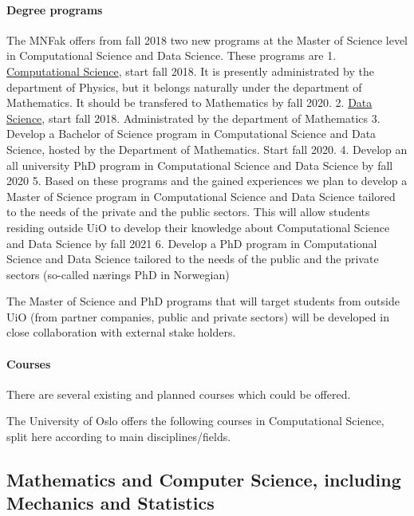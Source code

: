 \documentclass[]{article}
\let\oldparagraph\paragraph
\renewcommand{\paragraph}[1]{\oldparagraph{#1}\mbox{}}
\begin{document}
\hypertarget{degree-programs}{%
\paragraph{Degree programs}\label{degree-programs}}

The MNFak offers from fall 2018 two new programs at the Master of
Science level in Computational Science and Data Science. These programs
are 1.
\href{http://www.uio.no/english/studies/programmes/computational-science-master/index.html}{Computational
Science}, start fall 2018. It is presently administrated by the
department of Physics, but it belongs naturally under the department of
Mathematics. It should be transfered to Mathematics by fall 2020. 2.
\href{http://www.uio.no/english/studies/programmes/datascience-master/index.html}{Data
Science}, start fall 2018. Administrated by the department of
Mathematics 3. Develop a Bachelor of Science program in Computational
Science and Data Science, hosted by the Department of Mathematics. Start
fall 2020. 4. Develop an all university PhD program in Computational
Science and Data Science by fall 2020 5. Based on these programs and the
gained experiences we plan to develop a Master of Science program in
Computational Science and Data Science tailored to the needs of the
private and the public sectors. This will allow students residing
outside UiO to develop their knowledge about Computational Science and
Data Science by fall 2021 6. Develop a PhD program in Computational
Science and Data Science tailored to the needs of the public and the
private sectors (so-called nærings PhD in Norwegian)

The Master of Science and PhD programs that will target students from
outside UiO (from partner companies, public and private sectors) will be
developed in close collaboration with external stake holders.

\hypertarget{courses}{%
\paragraph{Courses}\label{courses}}

There are several existing and planned courses which could be offered.

The University of Oslo offers the following courses in Computational
Science, split here according to main disciplines/fields.

\hypertarget{mathematics-and-computer-science-including-mechanics-and-statistics}{%
\subsection{Mathematics and Computer Science, including Mechanics and
Statistics}\label{mathematics-and-computer-science-including-mechanics-and-statistics}}
\end{document}
